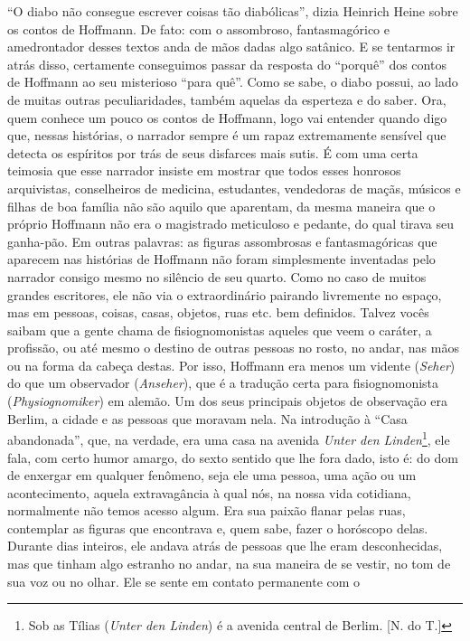 ``O diabo não consegue escrever coisas tão diabólicas'', dizia Heinrich
Heine sobre os contos de Hoffmann. De fato: com o assombroso,
fantasmagórico e amedrontador desses textos anda de mãos dadas algo
satânico. E se tentarmos ir atrás disso, certamente conseguimos passar
da resposta do ``porquê'' dos contos de Hoffmann ao seu misterioso
``para quê''. Como se sabe, o diabo possui, ao lado de muitas outras
peculiaridades, também aquelas da esperteza e do saber. Ora, quem
conhece um pouco os contos de Hoffmann, logo vai entender quando digo
que, nessas histórias, o narrador sempre é um rapaz extremamente
sensível que detecta os espíritos por trás de seus disfarces mais sutis.
É com uma certa teimosia que esse narrador insiste em mostrar que todos
esses honrosos arquivistas, conselheiros de medicina, estudantes,
vendedoras de maçãs, músicos e filhas de boa família não são aquilo que
aparentam, da mesma maneira que o próprio Hoffmann não era o magistrado
meticuloso e pedante, do qual tirava seu ganha-pão. Em outras palavras:
as figuras assombrosas e fantasmagóricas que aparecem nas histórias de
Hoffmann não foram simplesmente inventadas pelo narrador consigo mesmo
no silêncio de seu quarto. Como no caso de muitos grandes escritores,
ele não via o extraordinário pairando livremente no espaço, mas em
pessoas, coisas, casas, objetos, ruas etc. bem definidos. Talvez vocês
saibam que a gente chama de fisiognomonistas aqueles que veem o caráter,
a profissão, ou até mesmo o destino de outras pessoas no rosto, no
andar, nas mãos ou na forma da cabeça destas. Por isso, Hoffmann era
menos um vidente (\emph{Seher}) do que um observador (\emph{Anseher}),
que é a tradução certa para fisiognomonista (\emph{Physiognomiker}) em
alemão. Um dos seus principais objetos de observação era Berlim, a
cidade e as pessoas que moravam nela. Na introdução à ``Casa
abandonada'', que, na verdade, era uma casa na avenida \emph{Unter den
Linden}\footnote{Sob as Tílias (\emph{Unter den Linden}) é a avenida
  central de Berlim. {[}N. do T.{]}}, ele fala, com certo humor amargo,
do sexto sentido que lhe fora dado, isto é: do dom de enxergar em
qualquer fenômeno, seja ele uma pessoa, uma ação ou um acontecimento,
aquela extravagância à qual nós, na nossa vida cotidiana, normalmente
não temos acesso algum. Era sua paixão flanar pelas ruas, contemplar as
figuras que encontrava e, quem sabe, fazer o horóscopo delas. Durante
dias inteiros, ele andava atrás de pessoas que lhe eram desconhecidas,
mas que tinham algo estranho no andar, na sua maneira de se vestir, no
tom de sua voz ou no olhar. Ele se sente em contato permanente com o

